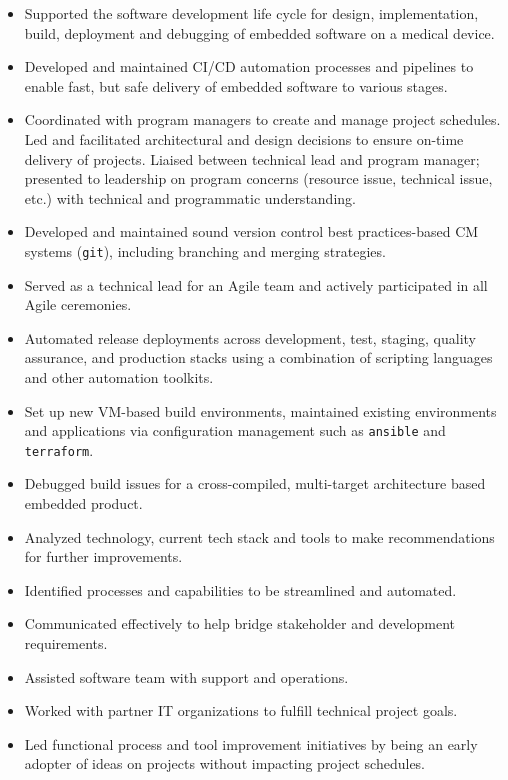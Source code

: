 \documentclass[letterpaper,10pt]{article}
\begin{document}
\begin{itemize}

\item
  Supported the software development life cycle for design, implementation,
  build, deployment and debugging of embedded software on a medical device.
\item
  Developed and maintained CI/CD automation processes and pipelines to enable
  fast, but safe delivery of embedded software to various stages.
\item
  Coordinated with program managers to create and manage project schedules. Led
  and facilitated architectural and design decisions to ensure on-time delivery
  of projects. Liaised between technical lead and program manager; presented to
  leadership on program concerns (resource issue, technical issue, etc.) with
  technical and programmatic understanding.
\item
  Developed and maintained sound version control best practices-based CM
  systems (\texttt{git}), including branching and merging strategies.
\item
  Served as a technical lead for an Agile team and actively participated in all
  Agile ceremonies.
\item
  Automated release deployments across development, test, staging, quality
  assurance, and production stacks using a combination of scripting languages
  and other automation toolkits.
\item
  Set up new VM-based build environments, maintained existing environments and
  applications via configuration management such as \texttt{ansible} and
  \texttt{terraform}.
\item
  Debugged build issues for a cross-compiled, multi-target architecture based
  embedded product.
\item
  Analyzed technology, current tech stack and tools to make recommendations for
  further improvements.
\item
  Identified processes and capabilities to be streamlined and automated.
\item
  Communicated effectively to help bridge stakeholder and development
  requirements.
\item
  Assisted software team with support and operations.
\item
  Worked with partner IT organizations to fulfill technical project goals.
\item
  Led functional process and tool improvement initiatives by being an early
  adopter of ideas on projects without impacting project schedules.

\end{itemize}
\end{document}
